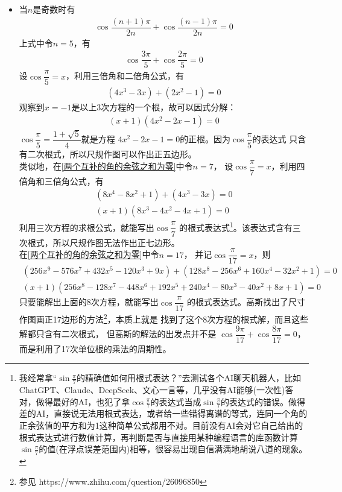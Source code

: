 \begin{itemize}[leftmargin=\inteval{\myitemleftmargin}pt,itemsep=
   \inteval{\myitemitempsep}pt,topsep=\inteval{\myitemtopsep}pt]
\item 当$ n $是奇数时有
\begin{gather}\label{两个互补的角的余弦之和为零}
    \cos\dfrac{(n+1)\pi}{2n}+\cos\dfrac{(n-1)\pi}{2n}=0
\end{gather}
上式中令$ n=5 $，有
\begin{gather*}
    \cos\dfrac{3\pi}{5}+\cos\dfrac{2\pi}{5}=0
\end{gather*}
设$ \cos\dfrac{\pi}{5}=x $，利用三倍角和二倍角公式，有
\begin{gather*}
    (4x^3-3x)+(2x^2-1)=0
\end{gather*}
观察到$ x=-1 $是以上3次方程的一个根，故可以因式分解：
\begin{gather*}
    (x+1)(4x^2-2x-1)=0
\end{gather*}
$ \cos\dfrac{\pi}{5}=\dfrac{1+\sqrt{5}}{4} $就是方程
$ 4 x^2-2x-1=0 $的正根。因为$ \cos\dfrac{\pi}{5} $的表达式
只含有二次根式，所以尺规作图可以作出正五边形。\\
类似地，在\eqref{两个互补的角的余弦之和为零}中令$ n=7 $，
设$ \cos\dfrac{\pi}{7}=x $，利用四倍角和三倍角公式，有
\begin{gather*}
    (8x^4-8x^2+1)+(4x^3-3x)=0 \\
    (x+1)(8x^3-4x^2-4x+1)=0
\end{gather*}
利用三次方程的求根公式，就能写出$ \cos\dfrac{\pi}{7} $
的根式表达式\footnote{我经常拿“$ \sin\frac{\pi}{7} $的精确值如何用根式表达？”去测试各个AI聊天机器人，比如ChatGPT、Claude、DeepSeek、文心一言等，几乎没有AI能够(一次性)答对，做得最好的AI，也犯了拿$ \cos\frac{\pi}{7} $的表达式当成$ \sin\frac{\pi}{7} $的表达式的错误。做得差的AI，直接说无法用根式表达，或者给一些错得离谱的等式，连同一个角的正余弦值的平方和为1这种简单公式都用不对。目前没有AI会对它自己给出的根式表达式进行数值计算，再判断是否与直接用某种编程语言的库函数计算$ \sin\frac{\pi}{7} $的值(在浮点误差范围内)相等，很容易出现自信满满地胡说八道的现象。}。该表达式含有三次根式，所以尺规作图无法作出正七边形。\\
在\eqref{两个互补的角的余弦之和为零}中令$ n=17 $，
并记$ \cos\dfrac{\pi}{17}=x $，则
\begin{gather*}
    (256x^9-576x^7+432x^5-120x^3+9x)+(128x^8-256x^6+160x^4-32x^2+1)=0\\
    (x+1)(256x^8-128x^7-448x^6+192x^5+240x^4-80x^3-40x^2+8x+1)=0
\end{gather*}
只要能解出上面的8次方程，就能写出$ \cos\dfrac{\pi}{17} $
的根式表达式。高斯找出了尺寸作图画正17边形的方法\footnote{参见
    https://www.zhihu.com/question/26096850}，本质上就是
找到了这个8次方程的根式解，而且这些解都只含有二次根式，
但高斯的解法的出发点并不是
$ \cos\dfrac{9\pi}{17}+\cos\dfrac{8\pi}{17}=0 $，
而是利用了17次单位根的乘法的周期性。


\end{itemize}
